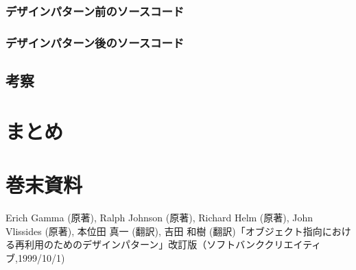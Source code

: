 \documentclass[dvipdfmx]{jsarticle}
\begin{document}
\subsubsection{デザインパターン前のソースコード}
\subsubsection{デザインパターン後のソースコード}
\subsection{考察}
\section{まとめ}
\section{巻末資料}
\begin{thebibliography}{99}
    Erich Gamma (原著), Ralph Johnson (原著), Richard Helm (原著), John Vlissides (原著), 本位田 真一 (翻訳), 吉田 和樹 (翻訳)「オブジェクト指向における再利用のためのデザインパターン」改訂版（ソフトバンククリエイティブ,1999/10/1)
\end{thebibliography}
\end{document}
